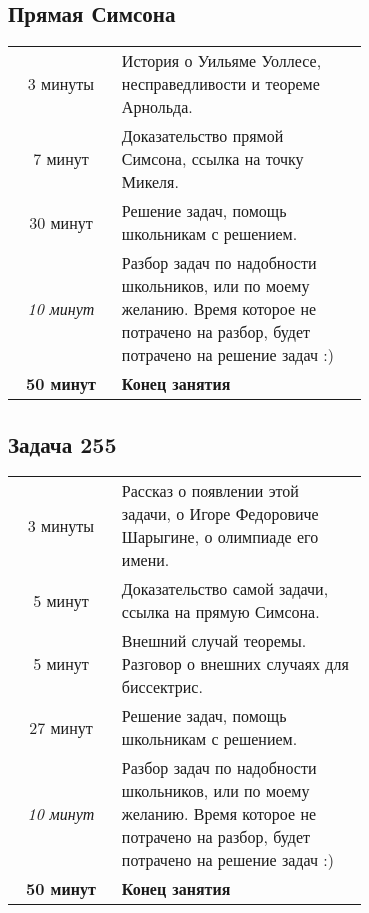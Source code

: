 \subsection{Прямая Симсона}
\begin{center}
    \begin{tabular}{c | p{0.7\linewidth}}                
        3 минуты & История о Уильяме Уоллесе, несправедливости и теореме Арнольда. \\ [3mm] 
        7 минут & Доказательство прямой Симсона, ссылка на точку Микеля. \\ [3mm]
        
        30 минут & Решение задач, помощь школьникам с решением.\\ [3mm]
        
        \textit{10 минут} & Разбор задач по надобности школьников, или по моему желанию. Время которое не потрачено на разбор, будет потрачено на решение задач :)\\ [3mm]
        
        \hline 
        \textbf{50 минут} & \textbf{Конец занятия}
    \end{tabular}
\end{center}

\subsection{Задача 255}
\begin{center}
    \begin{tabular}{c | p{0.7\linewidth}}                
        3 минуты & Рассказ о появлении этой задачи, о Игоре Федоровиче Шарыгине, о олимпиаде его имени. \\ [3mm]

        5 минут & Доказательство самой задачи, ссылка на прямую Симсона. \\ [3mm]
        
        5 минут & Внешний случай теоремы. Разговор о внешних случаях для биссектрис. \\ [3mm]
        
        27 минут & Решение задач, помощь школьникам с решением.\\ [3mm]
        
        \textit{10 минут} & Разбор задач по надобности школьников, или по моему желанию. Время которое не потрачено на разбор, будет потрачено на решение задач :)\\ [3mm]
        
        \hline 
        \textbf{50 минут} & \textbf{Конец занятия}
    \end{tabular}
\end{center}
